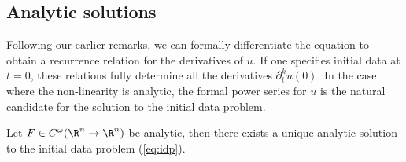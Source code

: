 \subsection{Analytic solutions}

Following our earlier remarks, we can formally differentiate the equation to obtain a recurrence relation for the derivatives of $u$. If one specifies initial data at $t = 0$, these relations fully determine all the derivatives $\partial_t^k u (0)$. In the case where the non-linearity is analytic, the formal power series for $u$ is the natural candidate for the solution to the initial data problem. 


\begin{theorem}
	Let $F \in C^\omega (\R^n \to \R^n)$ be analytic, then there exists a unique analytic solution to the initial data problem (\ref{eq:idp}). 
\end{theorem}

